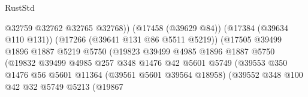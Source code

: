 \begin{lexlean}{RustStd}
\begin{coremodule}
                                                    @32759
                                                    @32762
                                                    @32765
                                                    @32768))
                                                (@17458 (@39629 @84))
                                                (@17384 (@39634 @110 @131))
                                                (@17266 (@39641 @131 @86 @5511 @5219))
                                                (@17505
                                                  @39499
                                                  @1896
                                                  @1887
                                                  @5219
                                                  @5750
                                                  (@19823
                                                    @39499
                                                    @4985
                                                    @1896
                                                    @1887
                                                    @5750
                                                    (@19832
                                                      @39499
                                                      @4985
                                                      @257
                                                      @348
                                                      @1476
                                                      @42
                                                      @5601
                                                      @5749
                                                      (@39553
                                                        @350
                                                        @1476
                                                        @56
                                                        @5601
                                                        @11364
                                                        (@39561 @5601 @39564 @18958)
                                                        (@39552
                                                          @348
                                                          @100
                                                          @42
                                                          @32
                                                          @5749
                                                          @5213
                                                          (@19867

\end{coremodule}
\end{lexlean}
